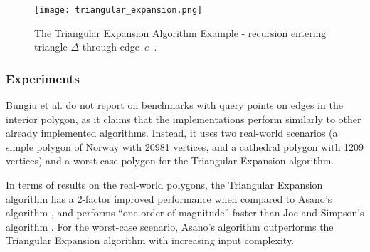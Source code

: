 \begin{figure}[h!]
	\centering
	\texttt{[image: triangular\_expansion.png]}
	\caption{The Triangular Expansion Algorithm Example - recursion entering triangle $\Delta$ through edge~$e$~\cite{DBLP:journals/corr/BungiuHHHK14}.}
	\label{fig:triangular}
\end{figure}

\subsubsection{Experiments}
Bungiu et al. do not report on benchmarks with query points on edges in the interior polygon, as it claims that the implementations perform similarly to other already implemented algorithms. Instead, it uses two real-world scenarios (a simple polygon of Norway with 20981 vertices, and a cathedral polygon with 1209 vertices) and a worst-case polygon for the Triangular Expansion algorithm.

In terms of results on the real-world polygons, the Triangular Expansion algorithm has a 2-factor improved performance when compared to Asano's algorithm \cite{asano1985efficient}, and performs ``one order of magnitude'' faster than Joe and Simpson's algorithm \cite{joe1987corrections}. For the worst-case scenario, Asano's algorithm \cite{asano1985efficient} outperforms the Triangular Expansion algorithm with increasing input complexity.

